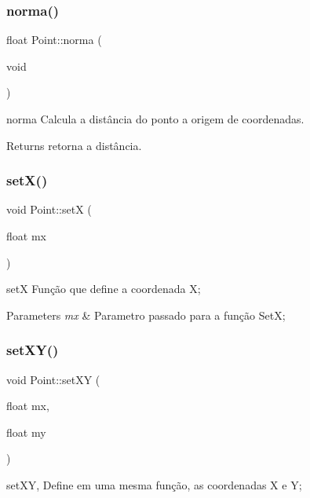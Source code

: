 \subsubsection{\texorpdfstring{norma()}{norma()}}
{\footnotesize\ttfamily float Point\+::norma (\begin{DoxyParamCaption}\item[{void}]{ }\end{DoxyParamCaption})}



norma Calcula a distância do ponto a origem de coordenadas. 

\begin{DoxyReturn}{Returns}
retorna a distância. 
\end{DoxyReturn}
\mbox{\label{class_point_acee4acaa1d515e9973145f977e500fe6}} 
\subsubsection{\texorpdfstring{set\+X()}{setX()}}
{\footnotesize\ttfamily void Point\+::setX (\begin{DoxyParamCaption}\item[{float}]{mx }\end{DoxyParamCaption})}



setX Função que define a coordenada X; 


\begin{DoxyParams}{Parameters}
{\em mx} & Parametro passado para a função SetX; \\
\hline
\end{DoxyParams}
\mbox{\label{class_point_afe2b937778d9fe5c135ab61de91271e9}} 
\subsubsection{\texorpdfstring{set\+X\+Y()}{setXY()}}
{\footnotesize\ttfamily void Point\+::set\+XY (\begin{DoxyParamCaption}\item[{float}]{mx,  }\item[{float}]{my }\end{DoxyParamCaption})}



set\+XY, Define em uma mesma função, as coordenadas X e Y; 


